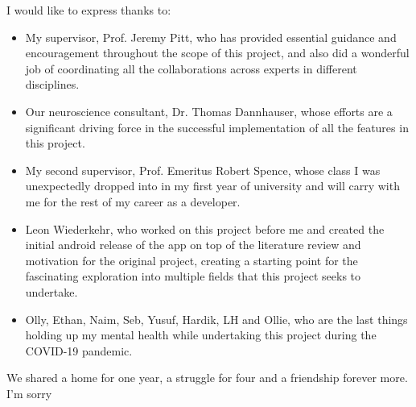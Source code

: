 \cleardoublepage

\begin{acknowledgements}

I would like to express thanks to:

\begin{itemize}
 \item My supervisor, Prof. Jeremy Pitt, who has provided essential guidance and encouragement throughout the scope of this project, and also did a wonderful job of coordinating all the collaborations across experts in different disciplines.
 \vspace*{3mm}
 \item Our neuroscience consultant, Dr. Thomas Dannhauser, whose efforts are a significant driving force in the successful implementation of all the features in this project.
 \item My second supervisor, Prof. Emeritus Robert Spence, whose class I was unexpectedly dropped into in my first year of university and will carry with me for the rest of my career as a developer.
 \vspace*{3mm}
 \item Leon Wiederkehr, who worked on this project before me and created the initial android release of the app on top of the literature review and motivation for the original project, creating a starting point for the fascinating exploration into multiple fields that this project seeks to undertake.
 \vspace*{3mm}
 \item Olly, Ethan, Naim, Seb, Yusuf, Hardik, LH and Ollie, who are the last things holding up my mental health while undertaking this project during the COVID-19 pandemic.
\end{itemize}

We shared a home for one year, a struggle for four and a friendship forever more. I'm sorry 

\end{acknowledgements}